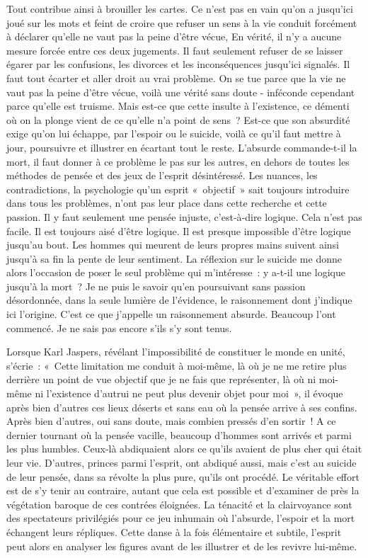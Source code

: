 \documentclass{book}
\begin{document}
Tout contribue ainsi à brouiller les cartes. Ce n'est pas en vain qu'on a jusqu'ici joué sur les mots et feint de croire que refuser un sens à la vie conduit forcément à déclarer qu'elle ne vaut pas la peine d'être vécue, En vérité, il n'y a aucune mesure forcée entre ces deux jugements. Il faut seulement refuser de se laisser égarer par les confusions, les divorces et les inconséquences jusqu'ici signalés. Il faut tout écarter et aller droit au vrai problème. On se tue parce que la vie ne vaut pas la peine d'être vécue, voilà une vérité sans doute - inféconde cependant parce qu'elle est truisme. Mais est-ce que cette insulte à l'existence, ce démenti où on la plonge vient de ce qu'elle n'a point de sens ? Est-ce que son absurdité exige qu'on lui échappe, par l'espoir ou le suicide, voilà ce qu'il faut mettre à jour, poursuivre et illustrer en écartant tout le reste. L'absurde commande-t-il la mort, il faut donner à ce problème le pas sur les autres, en dehors de toutes les méthodes de pensée et des jeux de l'esprit désintéressé. Les nuances, les contradictions, la psychologie qu'un esprit « objectif » sait toujours introduire dans tous les problèmes, n'ont pas leur place dans cette recherche et cette passion. Il y faut seulement une pensée injuste, c'est-à‑dire logique. Cela n'est pas facile. Il est toujours aisé d'être logique. Il est presque impossible d'être logique jusqu'au bout. Les hommes qui meurent de leurs propres mains suivent ainsi jusqu'à sa fin la pente de leur sentiment. La réflexion sur le suicide me donne alors l'occasion de poser le seul problème qui m'intéresse : y a-t-il une logique jusqu'à la mort ? Je ne puis le savoir qu'en poursuivant sans passion désordonnée, dans la seule lumière de l'évidence, le raisonnement dont j'indique ici l'origine. C'est ce que j'appelle un raisonnement absurde. Beaucoup l'ont commencé. Je ne sais pas encore s'ils s'y sont tenus.

Lorsque Karl Jaspers, révélant l'impossibilité de constituer le monde en unité, s'écrie : « Cette limitation me conduit à moi-même, là où je ne me retire plus derrière un point de vue objectif que je ne fais que représenter, là où ni moi-même ni l'existence d'autrui ne peut plus devenir objet pour moi », il évoque après bien d'autres ces lieux déserts et sans eau où la pensée arrive à ses confins. Après bien d'autres, oui sans doute, mais combien pressés d'en sortir ! A ce dernier tournant où la pensée vacille, beaucoup d'hommes sont arrivés et parmi les plus humbles. Ceux‑là abdiquaient alors ce qu'ils avaient de plus cher qui était leur vie. D'autres, princes parmi l'esprit, ont abdiqué aussi, mais c'est au suicide de leur pensée, dans sa révolte la plus pure, qu'ils ont procédé. Le véritable effort est de s'y tenir au contraire, autant que cela est possible et d'examiner de près la végétation baroque de ces contrées éloignées. La ténacité et la clairvoyance sont des spectateurs privilégiés pour ce jeu inhumain où l'absurde, l'espoir et la mort échangent leurs répliques. Cette danse à la fois élémentaire et subtile, l'esprit peut alors en analyser les figures avant de les illustrer et de les revivre lui‑même.
\end{document}
